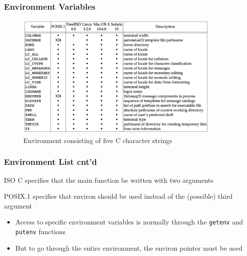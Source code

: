 \documentclass[newPxFont,sthlmFooter,nooffset]{beamer}
\begin{document}
\begin{frame}[t]
  \frametitle{Environment Variables}
\begin{figure}[h]
  \centering
  \includegraphics[width=0.9\textwidth]{figure/fig7-7_environment.png}
  \caption{Environment consisting of five C character strings}
\end{figure}
\end{frame}

\begin{frame}[t]
  \frametitle{Environment List cnt'd}
ISO C specifies that the main function be written with two arguments

POSIX.1 specifies that environ should be used instead of the (possible) third argument
\begin{itemize}
\item Access to specific environment variables is normally through the
  \texttt{getenv} and \texttt{putenv} functions
\item But to go through the entire environment, the environ pointer must be used
\end{itemize}

\end{frame}
\end{document}

